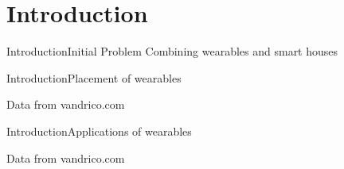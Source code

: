\section{Introduction}

\begin{frame}{Introduction}{Initial Problem}
\centering
Combining wearables and smart houses
\begin{figure}
\end{figure}
\end{frame}

\begin{frame}{Introduction}{Placement of wearables}
\centering
\begin{figure}
  \scalebox{0.8}{}
\end{figure}
{\tiny Data from vandrico.com}
\end{frame}

\begin{frame}{Introduction}{Applications of wearables}
\centering
\begin{figure}
  \scalebox{0.8}{}
\end{figure}
{\tiny Data from vandrico.com}
\end{frame}

